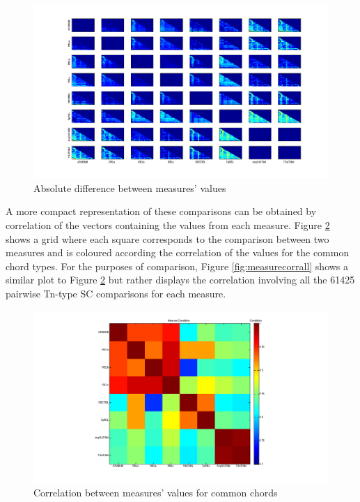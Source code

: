 \documentclass{article}
\begin{document}
\begin{figure}[htb]
 \centering
 \includegraphics[width=.9\linewidth]{../plots/Measure_comparisons.png}
 \caption{\label{fig:absdiff}Absolute difference between measures' values}
 \end{figure} 

A more compact representation of these comparisons can be obtained by
correlation of the vectors containing the values from each
measure. Figure \ref{fig:measurecorrchords} shows a grid where each
square corresponds to the comparison between two measures and is
coloured according the correlation of the values for the common chord
types. For the purposes of comparison, Figure \ref{fig:measurecorrall}
shows a similar plot to Figure \ref{fig:measurecorrchords} but rather
displays the correlation involving all the 61425 pairwise Tn-type SC
comparisons for each measure.

\begin{figure}[htb]
\centering
\includegraphics[width=.9\linewidth]{../plots/Measure_Correlation.png}
\caption{\label{fig:measurecorrchords}Correlation between measures' values for common chords}
\end{figure}
\end{document}
